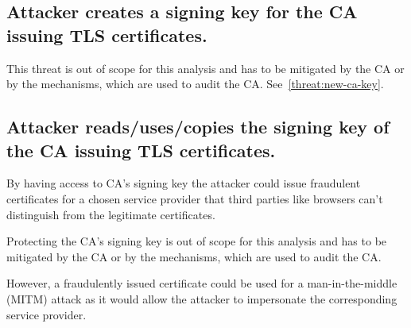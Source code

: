 \subsection{Attacker creates a signing key for the CA issuing TLS certificates.}
\label{threat:new-tls-ca-key}
This threat is out of scope for this analysis and has to be mitigated by the CA or by the mechanisms, which are used to audit the CA. See~\ref{threat:new-ca-key}.


\subsection{Attacker reads/uses/copies the signing key of the CA issuing TLS certificates.}
By having access to CA's signing key the attacker could issue fraudulent certificates for a chosen service provider that third parties like browsers can't distinguish from the legitimate certificates.

Protecting the CA's signing key is out of scope for this analysis and has to be mitigated by the CA or by the mechanisms, which are used to audit the CA.

However, a fraudulently issued certificate could be used for a man-in-the-middle (MITM) attack as it would allow the attacker to impersonate the corresponding service provider.

